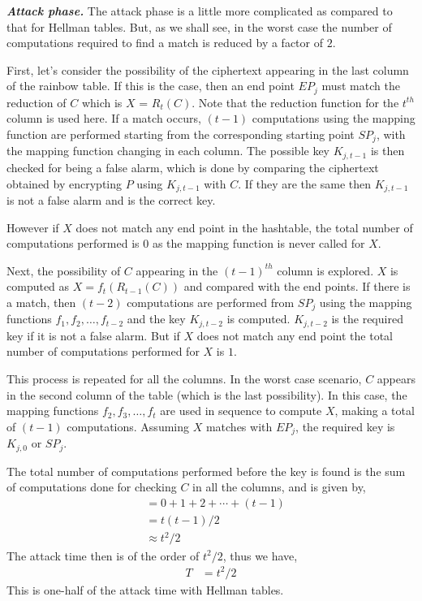 \noindent \textit{\textbf{Attack phase.}} The attack phase is a little more complicated as compared to that for Hellman tables. But, as we shall see, in the worst case the number of computations required to find a match is reduced by a factor of $2$. 

First, let's consider the possibility of the ciphertext appearing in the last column of the rainbow table. If this is the case, then an end point $EP_j$ must match the reduction of $C$ which is $X$ = $R_t(C)$. Note that the reduction function for the $t^{th}$ column is used here. If a match occurs, $(t-1)$ computations using the mapping function are performed starting from the corresponding starting point $SP_j$, with the mapping function changing in each column. The possible key $K_{j,t-1}$ is then checked for being a false alarm, which is done by comparing the ciphertext obtained by encrypting $P$ using $K_{j,t-1}$ with $C$. If they are the same then $K_{j,t-1}$ is not a false alarm and is the correct key. 

However if $X$ does not match any end point in the hashtable, the total number of computations performed is 0 as the mapping function is never called for $X$.

Next, the possibility of $C$ appearing in the $(t-1)^{th}$ column is explored. $X$ is computed as $X = f_{t}(R_{t-1}(C))$ and compared with the end points. If there is a match, then $(t-2)$ computations are performed from $SP_{j}$ using the mapping functions $f_1, f_2, \ldots, f_{t-2}$ and the key $K_{j,t-2}$ is computed. $K_{j,t-2}$ is the required key if it is not a false alarm. But if $X$ does not match any end point the total number of computations performed for $X$ is $1$.

This process is repeated for all the columns. In the worst case scenario, $C$ appears in the second column of the table (which is the last possibility). In this case, the mapping functions $f_2, f_3, \ldots, f_t$ are used in sequence to compute $X$, making a total of $(t-1)$ computations. Assuming $X$ matches with $EP_j$, the required key is $K_{j,0}$ or $SP_j$. 

The total number of computations performed before the key is found is the sum of computations done for checking $C$ in all the columns, and is given by,
\begin{align*}
&= 0 + 1 + 2 + \cdots + (t-1)\\
&= t(t-1)/2\\
&\approx t^2/2
\end{align*}
The attack time then is of the order of $t^2/2$, thus we have,
\begin{align}
\label{eq:time-rainbow-single-prefix} T &= t^2/2
\end{align}
This is one-half of the attack time with Hellman tables.\\

